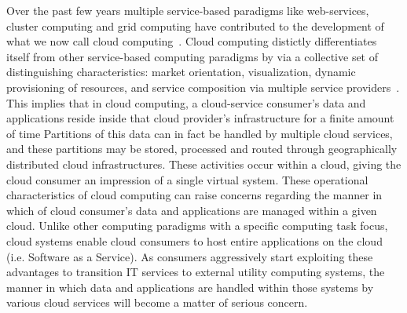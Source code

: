 \documentclass[times, 10pt,twocolumn]{article}
\begin{document}
Over the past few years multiple service-based paradigms like web-services, cluster computing and grid computing have contributed to the development of what we now call cloud computing~\cite{Bu:09}. Cloud computing distictly differentiates itself from other service-based computing paradigms by via a collective set of distinguishing characteristics:  market orientation, visualization, dynamic provisioning of resources, and service composition via multiple service providers~\cite{BuYeVeBrBr:09}. This implies that in cloud computing, a cloud-service consumer's data and applications reside inside that cloud provider's infrastructure for a finite amount of time  Partitions of this data can in fact be handled by multiple cloud services, and these partitions may be stored, processed and routed through geographically distributed cloud infrastructures. These activities occur within a cloud, giving the cloud consumer an impression of a single virtual system.  These operational characteristics of cloud computing can raise concerns regarding the manner in which of cloud consumer's data and applications are managed within a given cloud. Unlike other computing paradigms with a specific computing task focus, cloud systems enable cloud consumers to host entire applications on the cloud (i.e. Software as a Service). As consumers aggressively start exploiting these advantages to transition IT services to external utility computing systems, the manner in which data and applications are handled within those systems by various cloud services will become a matter of serious concern.   
\end{document}
